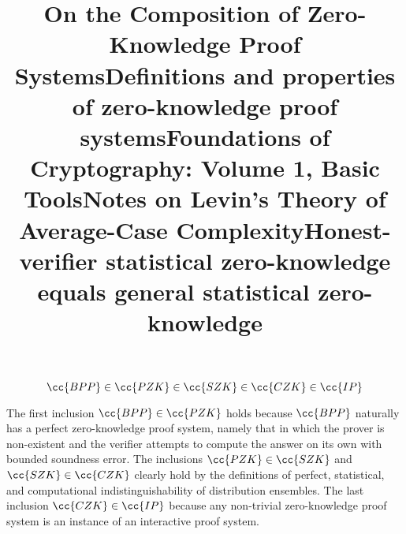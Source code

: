 \begin{theorem}
    \begin{equation}
        \cc{BPP} \in \cc{PZK} \in \cc{SZK} \in \cc{CZK} \in \cc{IP}
    \end{equation}

    \proof
    The first inclusion $\cc{BPP} \in \cc{PZK}$ holds because $\cc{BPP}$ naturally has a perfect zero-knowledge proof system, namely that in which the prover is non-existent and the verifier attempts to compute the answer on its own with bounded soundness error.
    The inclusions $\cc{PZK} \in \cc{SZK}$ and $\cc{SZK} \in \cc{CZK}$ clearly hold by the definitions of perfect, statistical, and computational indistinguishability of distribution ensembles.
    The last inclusion $\cc{CZK} \in \cc{IP}$ because any non-trivial zero-knowledge proof system is an instance of an interactive proof system.
\end{theorem}


\begin{references}
    \title{On the Composition of Zero-Knowledge Proof Systems}

    \title{Definitions and properties of zero-knowledge proof systems}

    \title{Foundations of Cryptography: Volume 1, Basic Tools}

    \title{Notes on Levin's Theory of Average-Case Complexity}

    \title{Honest-verifier statistical zero-knowledge equals general statistical zero-knowledge}
\end{references}